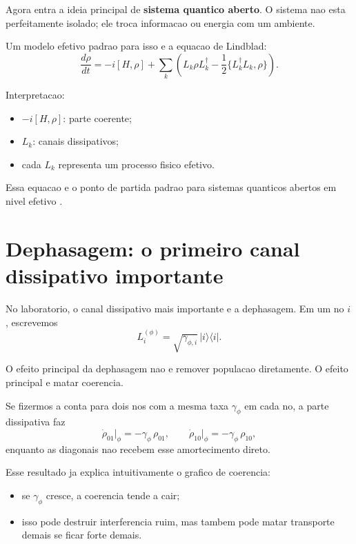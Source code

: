 \documentclass[11pt,a4paper]{article}
\begin{document}
Agora entra a ideia principal de \textbf{sistema quantico aberto}. O sistema nao
esta perfeitamente isolado; ele troca informacao ou energia com um ambiente.

Um modelo efetivo padrao para isso e a equacao de Lindblad:
\begin{equation}
\frac{d\rho}{dt}
= -i[H,\rho]
+ \sum_k \left(L_k\rho L_k^\dagger - \frac12\{L_k^\dagger L_k,\rho\}\right).
\end{equation}

Interpretacao:
\begin{itemize}
  \item $-i[H,\rho]$: parte coerente;
  \item $L_k$: canais dissipativos;
  \item cada $L_k$ representa um processo fisico efetivo.
\end{itemize}

Essa equacao e o ponto de partida padrao para sistemas quanticos abertos em
nivel efetivo \citep{breuer_petruccione_2007,rivas_huelga_2012}.

\section{Dephasagem: o primeiro canal dissipativo importante}

No laboratorio, o canal dissipativo mais importante e a dephasagem. Em um no
$i$, escrevemos
\begin{equation}
L_i^{(\phi)} = \sqrt{\gamma_{\phi,i}}\,|i\rangle\langle i|.
\end{equation}

O efeito principal da dephasagem nao e remover populacao diretamente. O efeito
principal e matar coerencia.

Se fizermos a conta para dois nos com a mesma taxa $\gamma_\phi$ em cada no, a
parte dissipativa faz
\begin{equation}
\dot{\rho}_{01}\Big|_{\phi} = -\gamma_\phi\,\rho_{01},
\qquad
\dot{\rho}_{10}\Big|_{\phi} = -\gamma_\phi\,\rho_{10},
\end{equation}
enquanto as diagonais nao recebem esse amortecimento direto.

Esse resultado ja explica intuitivamente o grafico de coerencia:
\begin{itemize}
  \item se $\gamma_\phi$ cresce, a coerencia tende a cair;
  \item isso pode destruir interferencia ruim, mas tambem pode matar
  transporte demais se ficar forte demais.
\end{itemize}
\end{document}
